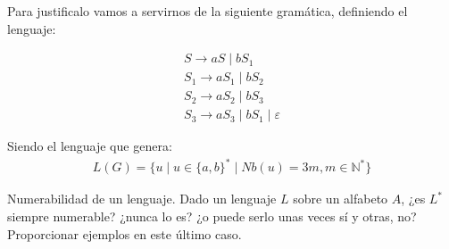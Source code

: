 \documentclass[12pt]{book} %
\begin{document}
\begin{solucion}

Para justificalo vamos a servirnos de la siguiente gramática, definiendo el lenguaje:

\begin{align*}
    S \rightarrow aS \mid bS_1 \\
    S_1 \rightarrow aS_1 \mid bS_2 \\
    S_2 \rightarrow aS_2 \mid bS_3 \\
    S_3 \rightarrow aS_3 \mid bS_1 \mid \varepsilon
\end{align*}

Siendo el lenguaje que genera:
\begin{align*}
    L(G) = \{u  \mid u \in \{a,b\}^* \mid Nb(u) = 3m, m \in \mathbb{N}^*  \}
\end{align*}

\end{solucion}

\begin{ejercicio}
Numerabilidad de un lenguaje.
Dado un lenguaje $L$ sobre un alfabeto $A$, ¿es $L^*$ siempre numerable? ¿nunca lo es? ¿o puede serlo unas veces sí y otras, no? Proporcionar ejemplos en este último caso.
\end{ejercicio}
\end{document}
